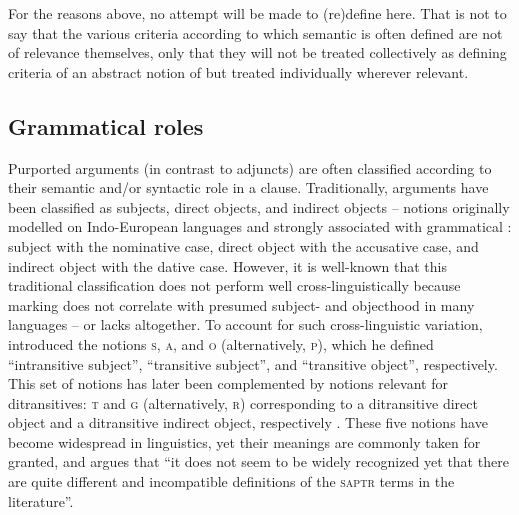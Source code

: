 For the reasons above, no attempt will be made to (re)define  here. That is not to say that the various criteria according to which semantic  is often defined are not of relevance themselves, only that they will not be treated collectively as defining criteria of an abstract notion of  but treated individually wherever relevant.  

\subsection{Grammatical roles} \label{grammatical-roles}
Purported arguments (in contrast to adjuncts) are often classified according to their semantic and/or syntactic role in a clause. Traditionally, arguments have been classified as subjects, direct objects, and indirect objects -- notions originally modelled on Indo-European languages and strongly associated with grammatical : subject with the nominative case, direct object with the accusative case, and indirect object with the dative case. However, it is well-known that this traditional classification does not perform well cross-linguistically because  marking does not correlate with presumed subject- and objecthood in many languages -- or lacks altogether. To account for such cross-linguistic variation, \citet[59, 128]{dixon:1972} introduced the notions \textsc{s}, \textsc{a}, and \textsc{o} (alternatively, \textsc{p}), which he defined “intransitive subject”, “transitive subject”, and “transitive object”, respectively. This set of notions has later been complemented by notions relevant for ditransitives: \textsc{t} and \textsc{g} (alternatively, \textsc{r}) corresponding to a ditransitive direct object and a ditransitive indirect object, respectively \citep{croft:1990}. These five notions have become widespread in linguistics, yet their meanings are commonly taken for granted, and \citet[536]{haspelmath:2011a} argues that “it does not seem to be widely recognized yet that there are quite different and incompatible definitions of the \textsc{saptr} terms in the literature”.

